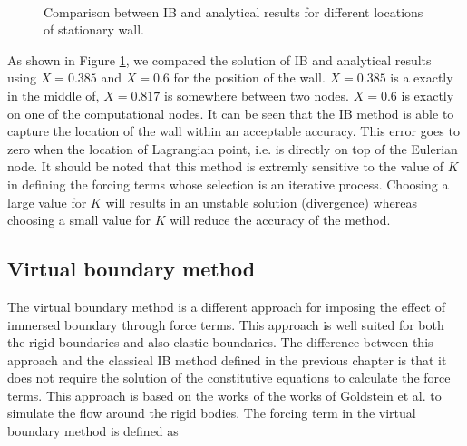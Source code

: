 \begin{figure}[h]
{	}
	\\
	\quad
	\caption{Comparison between IB and analytical results for different locations of stationary wall.}
	\label{fig:C3_peskinResults}
\end{figure}

As shown in Figure \ref{fig:C3_peskinResults}, we compared the solution of IB and analytical results using $X=0.385$ and $X=0.6$ for the position of the wall. $X=0.385$ is a exactly in the middle of, $X=0.817$ is somewhere between two nodes. $X=0.6$ is exactly on one of the computational nodes. It can be seen that the IB method is able to capture the location of the wall within an acceptable accuracy. This error goes to zero when the location of Lagrangian point, i.e. is directly on top of the Eulerian node. It should be noted that this method is extremly sensitive to the value of $K$ in defining the forcing terms whose selection is an iterative process. Choosing a large value for $K$ will results in an unstable solution (divergence) whereas choosing a small value for $K$ will reduce the accuracy of the method.

\subsection{Virtual boundary method}
The virtual boundary method is a different approach for imposing the effect of immersed boundary through force terms. This approach is well suited for both the rigid boundaries and also elastic boundaries. The difference between this approach and the classical IB method defined in the previous chapter is that it does not require the solution of the constitutive equations to calculate the force terms. This approach is based on the works of the works of Goldstein et al. \cite{goldstein1993modeling} to simulate the flow around the rigid bodies. The forcing term in the virtual boundary method is defined as

